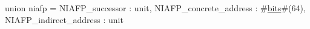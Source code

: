 union niafp = {
  NIAFP_successor : unit,
  NIAFP_concrete_address : #\hyperref[sailRISCVzbits]{bits}#(64),
  NIAFP_indirect_address : unit
}
